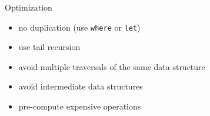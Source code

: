 \documentclass{beamer}
\def\code#1{\texttt{\frenchspacing#1}}
\begin{document}
\begin{frame}{Optimization}

\begin{itemize}
    \item no duplication (use \code{where} or \code{let})\pause
    \item use tail recursion\pause
    \item avoid multiple traversals of the same data structure\pause
    \item avoid intermediate data structures\pause
    \item pre-compute expensive operations
\end{itemize}

\end{frame}
\end{document}

